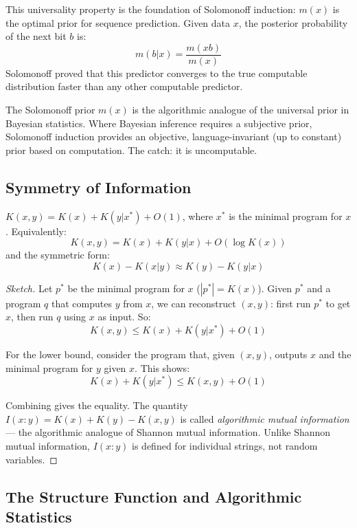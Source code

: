 This universality property is the foundation of Solomonoff induction: $m(x)$ is the optimal prior for sequence prediction. Given data $x$, the posterior probability of the next bit $b$ is:
\[
m(b | x) = \frac{m(xb)}{m(x)}
\]
Solomonoff proved that this predictor converges to the true computable distribution faster than any other computable predictor.

The Solomonoff prior $m(x)$ is the algorithmic analogue of the universal prior in Bayesian statistics. Where Bayesian inference requires a subjective prior, Solomonoff induction provides an objective, language-invariant (up to constant) prior based on computation. The catch: it is uncomputable.

\subsection{Symmetry of Information}
\label{sec:kolmogorov:symmetry}

\begin{theorem}
\label{thm:symmetry}
$K(x,y) = K(x) + K(y|x^*) + O(1)$, where $x^*$ is the minimal program for $x$.
Equivalently:
\[
K(x,y) = K(x) + K(y|x) + O(\log K(x))
\]
and the symmetric form:
\[
K(x) - K(x|y) \approx K(y) - K(y|x)
\]
\end{theorem}

\begin{proof}[Sketch]
Let $p^*$ be the minimal program for $x$ ($|p^*| = K(x)$). Given $p^*$ and a program $q$ that computes $y$ from $x$, we can reconstruct $(x,y)$: first run $p^*$ to get $x$, then run $q$ using $x$ as input. So:
\[
K(x,y) \le K(x) + K(y|x^*) + O(1)
\]

For the lower bound, consider the program that, given $(x,y)$, outputs $x$ and the minimal program for $y$ given $x$. This shows:
\[
K(x) + K(y|x^*) \le K(x,y) + O(1)
\]

Combining gives the equality. The quantity $I(x:y) = K(x) + K(y) - K(x,y)$ is called \emph{algorithmic mutual information} --- the algorithmic analogue of Shannon mutual information. Unlike Shannon mutual information, $I(x:y)$ is defined for individual strings, not random variables.
\end{proof}

\subsection{The Structure Function and Algorithmic Statistics}
\label{sec:kolmogorov:structure}

